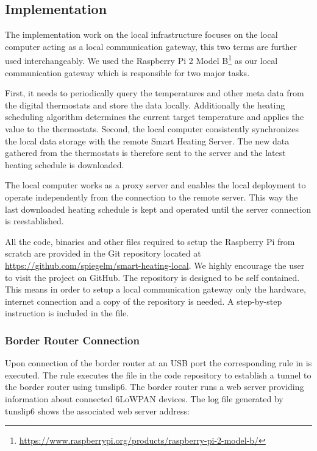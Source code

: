 \subsection{Implementation}
\label{sec:local_infrastructure_implementation}

The implementation work on the local infrastructure focuses on the local computer acting as a local communication gateway, this two terms are further used interchangeably.
We used the Raspberry Pi 2 Model B\footnote{\url{https://www.raspberrypi.org/products/raspberry-pi-2-model-b/}} as our local communication gateway which is responsible for two major tasks.

First, it needs to periodically query the temperatures and other meta data from the digital thermostats and store the data locally.
Additionally the heating scheduling algorithm determines the current target temperature and applies the value to the thermostats.
Second, the local computer consistently synchronizes the local data storage with the remote Smart Heating Server.
The new data gathered from the thermostats is therefore sent to the server and the latest heating schedule is downloaded.

The local computer works as a proxy server and enables the local deployment to operate independently from the connection to the remote server.
This way the last downloaded heating schedule is kept and operated until the server connection is reestablished.


All the code, binaries and other files required to setup the Raspberry Pi from scratch are provided in the Git repository located at \url{https://github.com/spiegelm/smart-heating-local}.
We highly encourage the user to visit the project on GitHub.
The repository is designed to be self contained.
This means in order to setup a local communication gateway only the hardware, internet connection and a copy of the repository is needed.
A step-by-step instruction is included in the  file.

\subsubsection{Border Router Connection}

Upon connection of the border router at an USB port the corresponding rule in  is executed.
The rule executes the file  in the code repository to establish a tunnel to the border router using tunslip6.
The border router runs a web server providing information about connected 6LoWPAN devices.
The log file  generated by tunslip6 shows the associated web server address:

